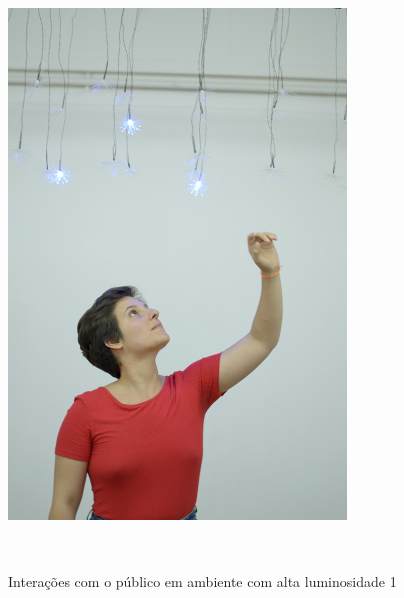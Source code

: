 \begin{apendicesenv}
\begin{figure}[H]
  \begin{center}
    \caption{Interações com o público em ambiente com alta luminosidade 1}
    \vspace*{0,2cm}
    \includegraphics[width=0.8\textwidth]{./04-figuras/instalacao_6}
    \label{fig:instalacao_6}
  \end{center}
  \vspace*{-0,9cm}
  \\
\end{figure}


\end{apendicesenv}

